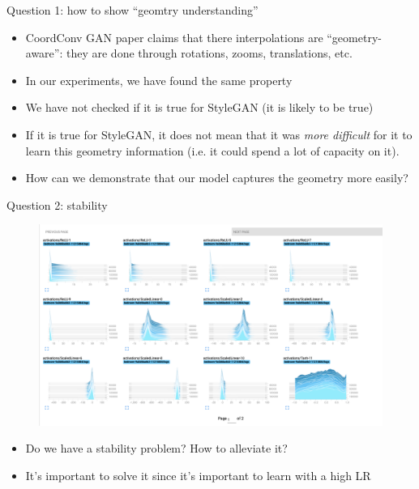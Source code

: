 \documentclass[10pt, handout]{beamer}
\begin{document}
\begin{frame}{Question 1: how to show ``geomtry understanding''}
    \begin{itemize}
        \item\pause CoordConv GAN paper claims that there interpolations are ``geometry-aware'': they are done through rotations, zooms, translations, etc.
        \item\pause In our experiments, we have found the same property
        \item\pause We have not checked if it is true for StyleGAN (it is likely to be true)
        \item\pause If it is true for StyleGAN, it does not mean that it was \textit{more difficult} for it to learn this geometry information (i.e. it could spend a lot of capacity on it).
        \item\pause How can we demonstrate that our model captures the geometry more easily?
    \end{itemize}
\end{frame}


\begin{frame}{Question 2: stability}
\begin{figure}
\centering
\includegraphics[width=\textwidth]{images/activations-hists}
\end{figure}
\begin{itemize}
    \item\pause Do we have a stability problem? How to alleviate it?
    \item\pause It's important to solve it since it's important to learn with a high LR 
\end{itemize}
\end{frame}
\end{document}
